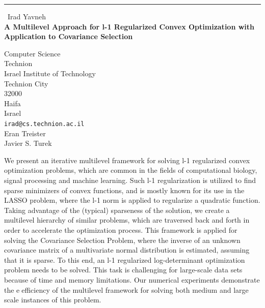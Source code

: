 \documentclass{report}
\begin{document}
\begin{center}
\rule{6in}{1pt} \
{\large Irad Yavneh \\
{\bf A Multilevel Approach for l-1 Regularized Convex Optimization with Application to Covariance Selection}}

Computer Science \\ Technion \\ Israel Institute of Technology \\ Technion City \\ 32000 \\ Haifa \\ Israel
\\
{\tt irad@cs.technion.ac.il}\\
Eran Treister\\
Javier S. Turek\end{center}

We present an iterative multilevel framework for solving l-1 regularized
convex optimization problems, which are common in the fields of
computational biology, signal processing and machine learning. Such l-1
regularization is utilized to find sparse
minimizers of convex functions, and is mostly known for its use in the
LASSO problem, where the l-1 norm is applied to regularize a quadratic
function. Taking advantage of the (typical) sparseness of the solution,
we create a multilevel hierarchy of similar problems, which are traversed
back and forth in order to accelerate the
optimization process. This framework is applied for solving the
Covariance Selection Problem, where the inverse of an unknown covariance
matrix of a multivariate normal distribution is estimated, assuming that
it is sparse. To this end, an l-1 regularized log-determinant
optimization problem needs to be solved. This task is challenging for
large-scale data sets because of time and memory limitations. Our
numerical experiments demonstrate the eefficiency of the multilevel
framework for solving both medium and large scale instances of this
problem.
\end{document}
